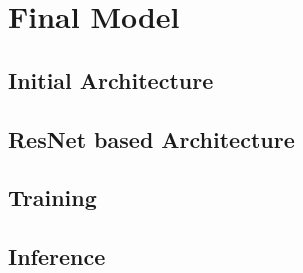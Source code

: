 \chapter{Final Model}

\section{Initial Architecture}

\section{ResNet based Architecture}

\section{Training}

\section{Inference}


